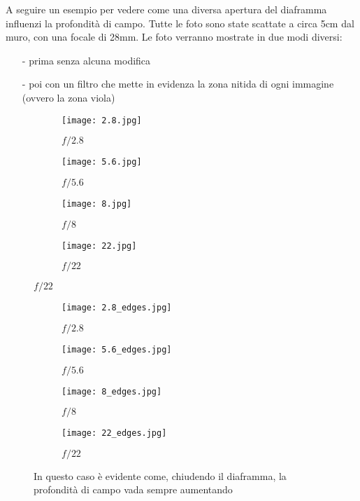 A seguire un esempio per vedere come una diversa apertura del diaframma influenzi la profondità di campo. Tutte le foto sono state scattate a circa 5cm dal muro, con una focale di 28mm.
Le foto verranno mostrate in due modi diversi:
\begin{itemize}
    \item[-] prima senza alcuna modifica
    \item[-] poi con un filtro che mette in evidenza la zona nitida di ogni immagine (ovvero la zona viola)
\end{itemize}

\begin{figure}[H] %
    \centering
        \begin{subfigure}{0.45\linewidth}
            \texttt{[image: 2.8.jpg]}
            \caption{$f/2.8$}
        \end{subfigure}
    \hfil
        \begin{subfigure}{0.45\linewidth}
            \texttt{[image: 5.6.jpg]}
            \caption{$f/5.6$}
        \end{subfigure}
    
        \begin{subfigure}{0.45\linewidth}
            \texttt{[image: 8.jpg]}
            \caption{$f/8$}
        \end{subfigure}
    \hfil
        \begin{subfigure}{0.45\linewidth}
            \texttt{[image: 22.jpg]}
            \caption{$f/22$}
        \end{subfigure}
    
\end{figure}

\begin{figure}[H]
    \centering
        \begin{subfigure}{0.45\linewidth}
            \texttt{[image: 2.8\_edges.jpg]}
            \caption{$f/2.8$}
        \end{subfigure}
    \hfil
        \begin{subfigure}{0.45\linewidth}
            \texttt{[image: 5.6\_edges.jpg]}
            \caption{$f/5.6$}
        \end{subfigure}
    
        \begin{subfigure}{0.45\linewidth}
            \texttt{[image: 8\_edges.jpg]}
            \caption{$f/8$}
        \end{subfigure}
    \hfil
        \begin{subfigure}{0.45\linewidth}
            \texttt{[image: 22\_edges.jpg]}
            \caption{$f/22$}
        \end{subfigure}
    
    \caption{In questo caso è evidente come, chiudendo il diaframma, la profondità di campo vada sempre aumentando}
\end{figure}


